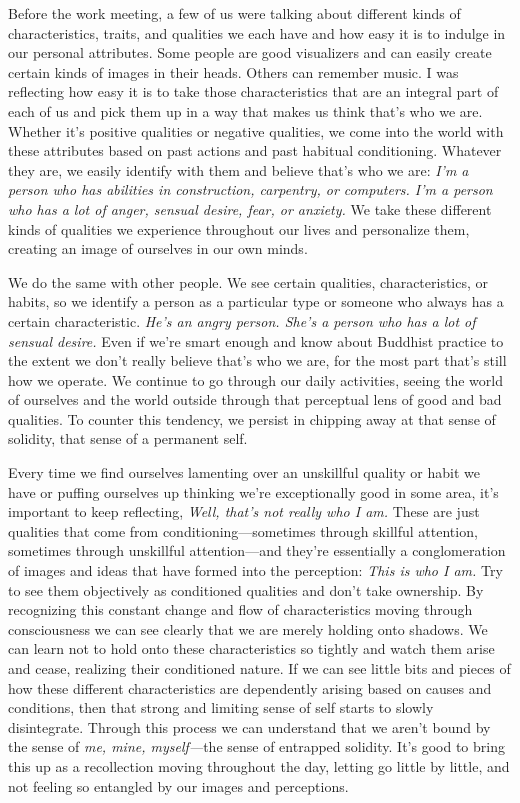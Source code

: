 Before the work meeting, a few of us were talking about different kinds 
of characteristics, traits, and qualities we each have and how easy it 
is to indulge in our personal attributes. Some people are good 
visualizers and can easily create certain kinds of images in their 
heads. Others can remember music. I was reflecting how easy it is to 
take those characteristics that are an integral part of each of us and 
pick them up in a way that makes us think that's who we are. Whether 
it's positive qualities or negative qualities, we come into the world 
with these attributes based on past actions and past habitual 
conditioning. Whatever they are, we easily identify with them and 
believe that's who we are: \emph{I'm a person who has abilities in 
construction, carpentry, or computers. I'm a person who has a lot of 
anger, sensual desire, fear, or anxiety.} We take these different kinds 
of qualities we experience throughout our lives and personalize them, 
creating an image of ourselves in our own minds.

We do the same with other people. We see certain qualities, 
characteristics, or habits, so we identify a person as a particular 
type or someone who always has a certain characteristic. \emph{He's an 
angry person. She's a person who has a lot of sensual desire.} Even if 
we're smart enough and know about Buddhist practice to the extent we 
don't really believe that's who we are, for the most part that's still 
how we operate. We continue to go through our daily activities, seeing 
the world of ourselves and the world outside through that perceptual 
lens of good and bad qualities. To counter this tendency, we persist in 
chipping away at that sense of solidity, that sense of a permanent self.

Every time we find ourselves lamenting over an unskillful quality or 
habit we have or puffing ourselves up thinking we're exceptionally good 
in some area, it's important to keep reflecting, \emph{Well, that's not 
really who I am.} These are just qualities that come from 
conditioning---sometimes through skillful attention, sometimes through 
unskillful attention---and they're essentially a conglomeration of 
images and ideas that have formed into the perception: \emph{This is 
who I am.} Try to see them objectively as conditioned qualities and 
don't take ownership. By recognizing this constant change and flow of 
characteristics moving through consciousness we can see clearly that we 
are merely holding onto shadows. We can learn not to hold onto these 
characteristics so tightly and watch them arise and cease, realizing 
their conditioned nature. If we can see little bits and pieces of how 
these different characteristics are dependently arising based on causes 
and conditions, then that strong and limiting sense of self starts to 
slowly disintegrate. Through this process we can understand that we 
aren't bound by the sense of \emph{me, mine, myself---}the sense of 
entrapped solidity. It's good to bring this up as a recollection moving 
throughout the day, letting go little by little, and not feeling so 
entangled by our images and perceptions.

